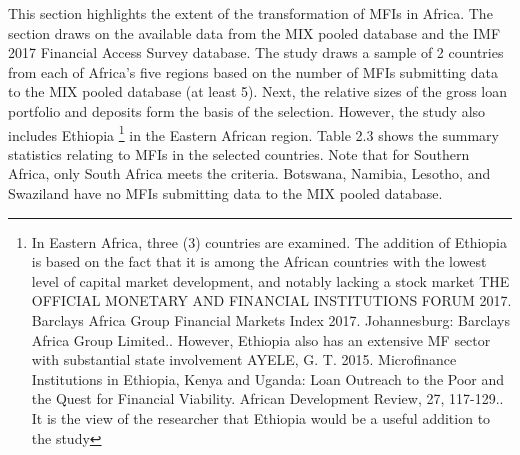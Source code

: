 \documentclass[a4paper, nobind]{templates/ociamthesis}
\begin{document}
\noindent This section highlights the extent of the transformation of MFIs in Africa. The section draws on the available data from the MIX pooled database and the IMF 2017 Financial Access Survey database. The study draws a sample of 2 countries from each of Africa's five regions based on the number of MFIs submitting data to the MIX pooled database (at least 5). Next, the relative sizes of the gross loan portfolio and deposits form the basis of the selection. However, the study also includes Ethiopia \footnote{In Eastern Africa, three (3) countries are examined. The addition of Ethiopia is based on the fact that it is among the African countries with the lowest level of capital market development, and notably lacking a stock market THE OFFICIAL MONETARY AND FINANCIAL INSTITUTIONS FORUM 2017. Barclays Africa Group Financial Markets Index 2017. Johannesburg: Barclays Africa Group Limited.. However, Ethiopia also has an extensive MF sector with substantial state involvement AYELE, G. T. 2015. Microfinance Institutions in Ethiopia, Kenya and Uganda: Loan Outreach to the Poor and the Quest for Financial Viability. African Development Review, 27, 117-129.. It is the view of the researcher that Ethiopia would be a useful addition to the study} in the Eastern African region. Table 2.3 shows the summary statistics relating to MFIs in the selected countries. Note that for Southern Africa, only South Africa meets the criteria. Botswana, Namibia, Lesotho, and Swaziland have no MFIs submitting data to the MIX pooled database.
\end{document}
